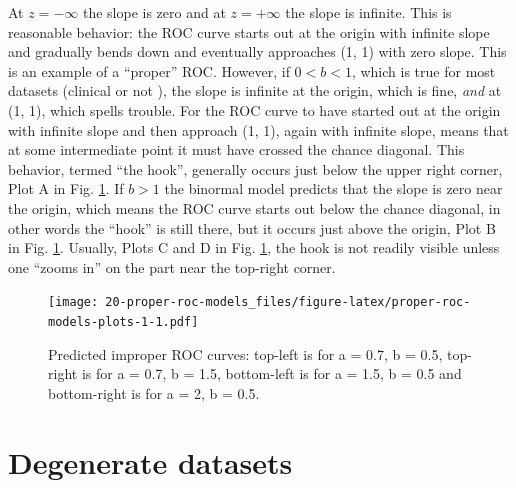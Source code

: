 \documentclass[
]{book}
\begin{document}
At \(z=-\infty\) the slope is zero and at \(z=+\infty\) the slope is infinite. This is reasonable behavior: the ROC curve starts out at the origin with infinite slope and gradually bends down and eventually approaches (1, 1) with zero slope. This is an example of a ``proper'' ROC. However, if \(0 < b < 1\), which is true for most datasets (clinical or not \citep{green1966signal}), the slope is infinite at the origin, which is fine, \emph{and} at (1, 1), which spells trouble. For the ROC curve to have started out at the origin with infinite slope and then approach (1, 1), again with infinite slope, means that at some intermediate point it must have crossed the chance diagonal. This behavior, termed ``the hook'', generally occurs just below the upper right corner, Plot A in Fig. \ref{fig:proper-roc-models-plots-1}. If \(b > 1\) the binormal model predicts that the slope is zero near the origin, which means the ROC curve starts out below the chance diagonal, in other words the ``hook'' is still there, but it occurs just above the origin, Plot B in Fig. \ref{fig:proper-roc-models-plots-1}. Usually, Plots C and D in Fig. \ref{fig:proper-roc-models-plots-1}, the hook is not readily visible unless one ``zooms in'' on the part near the top-right corner.

\begin{figure}
\centering
\texttt{[image: 20-proper-roc-models\_files/figure-latex/proper-roc-models-plots-1-1.pdf]}
\caption{\label{fig:proper-roc-models-plots-1}Predicted improper ROC curves: top-left is for a = 0.7, b = 0.5, top-right is for a = 0.7, b = 1.5, bottom-left is for a = 1.5, b = 0.5 and bottom-right is for a = 2, b = 0.5.}
\end{figure}

\hypertarget{proper-roc-models-degenerate-datasets}{%
\section{Degenerate datasets}\label{proper-roc-models-degenerate-datasets}}
\end{document}
